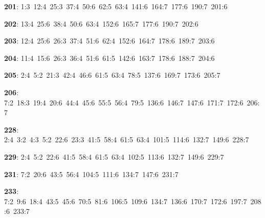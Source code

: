 \noindent \textbf{201}: 1:3\allowbreak\ 12:4\allowbreak\ 25:3\allowbreak\ 37:4\allowbreak\ 50:6\allowbreak\ 62:5\allowbreak\ 63:4\allowbreak\ 141:6\allowbreak\ 164:7\allowbreak\ 177:6\allowbreak\ 190:7\allowbreak\ 201:6\par
\noindent \textbf{202}: 13:4\allowbreak\ 25:6\allowbreak\ 38:4\allowbreak\ 50:6\allowbreak\ 63:4\allowbreak\ 152:6\allowbreak\ 165:7\allowbreak\ 177:6\allowbreak\ 190:7\allowbreak\ 202:6\par
\noindent \textbf{203}: 12:4\allowbreak\ 25:6\allowbreak\ 26:3\allowbreak\ 37:4\allowbreak\ 51:6\allowbreak\ 62:4\allowbreak\ 152:6\allowbreak\ 164:7\allowbreak\ 178:6\allowbreak\ 189:7\allowbreak\ 203:6\par
\noindent \textbf{204}: 11:4\allowbreak\ 15:6\allowbreak\ 26:3\allowbreak\ 36:4\allowbreak\ 51:6\allowbreak\ 61:5\allowbreak\ 142:6\allowbreak\ 163:7\allowbreak\ 178:6\allowbreak\ 188:7\allowbreak\ 204:6\par
\noindent \textbf{205}: 2:4\allowbreak\ 5:2\allowbreak\ 21:3\allowbreak\ 42:4\allowbreak\ 46:6\allowbreak\ 61:5\allowbreak\ 63:4\allowbreak\ 78:5\allowbreak\ 137:6\allowbreak\ 169:7\allowbreak\ 173:6\allowbreak\ 205:7\par
\noindent \textbf{206}: 7:2\allowbreak\ 18:3\allowbreak\ 19:4\allowbreak\ 20:6\allowbreak\ 44:4\allowbreak\ 45:6\allowbreak\ 55:5\allowbreak\ 56:4\allowbreak\ 79:5\allowbreak\ 136:6\allowbreak\ 146:7\allowbreak\ 147:6\allowbreak\ 171:7\allowbreak\ 172:6\allowbreak\ 206:7\par
\noindent \textbf{228}: 2:4\allowbreak\ 3:2\allowbreak\ 4:3\allowbreak\ 5:2\allowbreak\ 22:6\allowbreak\ 23:3\allowbreak\ 41:5\allowbreak\ 58:4\allowbreak\ 61:5\allowbreak\ 63:4\allowbreak\ 101:5\allowbreak\ 114:6\allowbreak\ 132:7\allowbreak\ 149:6\allowbreak\ 228:7\par
\noindent \textbf{229}: 2:4\allowbreak\ 5:2\allowbreak\ 22:6\allowbreak\ 41:5\allowbreak\ 58:4\allowbreak\ 61:5\allowbreak\ 63:4\allowbreak\ 102:5\allowbreak\ 113:6\allowbreak\ 132:7\allowbreak\ 149:6\allowbreak\ 229:7\par
\noindent \textbf{231}: 7:2\allowbreak\ 20:6\allowbreak\ 43:5\allowbreak\ 56:4\allowbreak\ 104:5\allowbreak\ 111:6\allowbreak\ 134:7\allowbreak\ 147:6\allowbreak\ 231:7\par
\noindent \textbf{233}: 7:2\allowbreak\ 9:6\allowbreak\ 18:4\allowbreak\ 43:5\allowbreak\ 45:6\allowbreak\ 70:5\allowbreak\ 81:6\allowbreak\ 106:5\allowbreak\ 109:6\allowbreak\ 134:7\allowbreak\ 136:6\allowbreak\ 170:7\allowbreak\ 172:6\allowbreak\ 197:7\allowbreak\ 208:6\allowbreak\ 233:7\par
